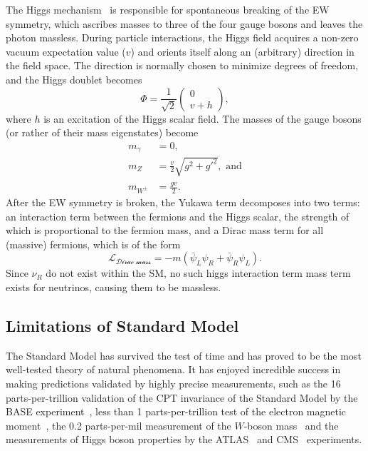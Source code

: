 The Higgs mechanism~\cite{PhysRevLett.13.508, PhysRevLett.13.321} is responsible for spontaneous breaking of the EW symmetry, which ascribes masses to three of the four gauge bosons and leaves the photon massless. During particle interactions, the Higgs field acquires a non-zero vacuum expectation value ($v$) and orients itself along an (arbitrary) direction in the field space. The direction is normally chosen to minimize degrees of freedom, and the Higgs doublet becomes
\begin{equation}\label{eq:higgs_vev}
    \Phi = \frac{1}{\sqrt{2}}\left(\begin{array}{c} 0 \\ v+h \end{array}\right),
\end{equation}
where $h$ is an excitation of the Higgs scalar field. The masses of the gauge bosons (or rather of their mass eigenstates) become
\begin{equation}
\begin{split}
m_\gamma &= 0, \\
m_Z &= \frac{v}{2}\sqrt{g^2 + g'^2}, \text{ and} \\
m_{W^\pm} &=  \frac{gv}{2}.
\end{split}
\end{equation}
After the EW symmetry is broken, the Yukawa term decomposes into two terms: an interaction term between the fermions and the Higgs scalar, the strength of which is proportional to the fermion mass, and a Dirac mass term for all (massive) fermions, which is of the form
\begin{equation}
    \mathcal{L_\text{Dirac mass}} = -m (\bar{\psi}_L\psi_R + \bar{\psi}_R\psi_L).
\end{equation}
Since $\nu_R$ do not exist within the SM, no such higgs interaction term mass term exists for neutrinos, causing them to be massless.

\subsection{Limitations of Standard Model}
The Standard Model has survived the test of time and has proved to be the most well-tested theory of natural phenomena. It has enjoyed incredible success in making predictions validated by highly precise measurements, such as the 16 parts-per-trillion validation of the CPT invariance of the Standard Model by the BASE experiment~\cite{Borchert2022}, less than 1 parts-per-trillion test of the electron magnetic moment~\cite{PhysRevA.83.052122}, the 0.2 parts-per-mil measurement of the $W$-boson mass~\cite{atlascollaboration2024measurement} and the measurements of Higgs boson properties by the ATLAS~\cite{ATLASNature} and CMS~\cite{CMSNature} experiments.

